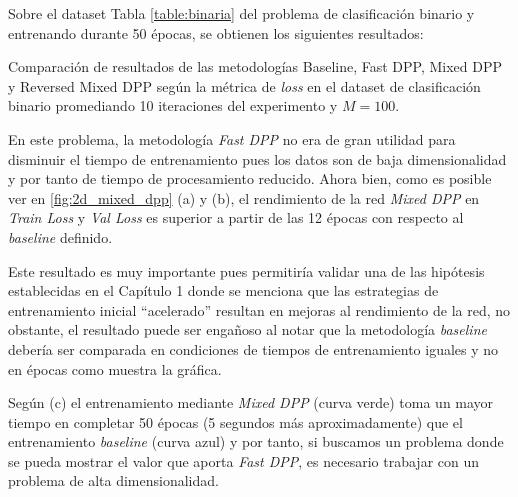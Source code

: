 \vspace{0.2cm}

Sobre el dataset Tabla \ref{table:binaria} del problema de clasificación binario y entrenando durante 50 épocas, se obtienen los siguientes resultados: 


\begin{images}[\label{fig:2d_mixed_dpp}]{\centering Comparación de resultados de las metodologías Baseline, Fast DPP, Mixed DPP y Reversed Mixed DPP según la métrica de \textit{loss} en el dataset de clasificación binario promediando 10 iteraciones del experimento y $M=100$.}

\end{images}

En este problema, la metodología \textit{Fast DPP} no era de gran utilidad para disminuir el tiempo de entrenamiento pues los datos son de baja dimensionalidad y por tanto de tiempo de procesamiento reducido. Ahora bien, como es posible ver en \ref{fig:2d_mixed_dpp} (a) y (b), el rendimiento de la red \textit{Mixed DPP} en \textit{Train Loss} y \textit{Val Loss} es superior a partir de las 12 épocas con respecto al \textit{baseline} definido. 

\vspace{0.2cm}

Este resultado es muy importante pues permitiría validar una de las hipótesis establecidas en el Capítulo 1 donde se menciona que las estrategias de entrenamiento inicial ``acelerado'' resultan en mejoras al rendimiento de la red, no obstante, el resultado puede ser engañoso al notar que la metodología \textit{baseline} debería ser comparada en condiciones de tiempos de entrenamiento iguales y no en épocas como muestra la gráfica. 

\vspace{0.2cm}

Según (c) el entrenamiento mediante \textit{Mixed DPP} (curva verde) toma un mayor tiempo en completar 50 épocas (5 segundos más aproximadamente) que el entrenamiento \textit{baseline} (curva azul) y por tanto, si buscamos un problema donde se pueda mostrar el valor que aporta \textit{Fast DPP}, es necesario trabajar con un problema de alta dimensionalidad. 

